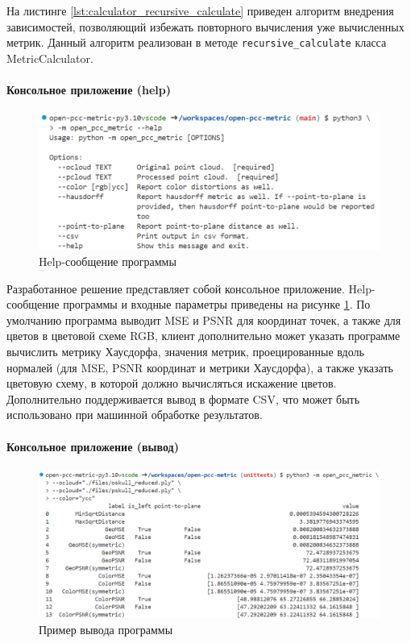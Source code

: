 \documentclass[a4paper,12pt]{extreport}
\begin{document}
На листинге \ref{lst:calculator_recursive_calculate} приведен алгоритм внедрения
зависимостей, позволяющий избежать повторного вычисления уже вычисленных метрик.
Данный алгоритм реализован в методе \texttt{recursive\_calculate} класса
MetricCalculator.

\paragraph{Консольное приложение (help)}

\begin{figure}[H]
    \centering
    \includegraphics[width=0.7\linewidth]{assets/open_pcc_metric_help.png}
    \caption{Help-сообщение программы}
    \label{img:pcc_metric_help}
\end{figure}

Разработанное решение представляет собой консольное приложение. Help-сообщение
программы и входные параметры приведены на рисунке \ref{img:pcc_metric_help}. По
умолчанию программа выводит MSE и PSNR для координат точек, а также для цветов в
цветовой схеме RGB, клиент дополнительно может указать программе вычислить
метрику Хаусдорфа, значения метрик, проецированные вдоль нормалей (для MSE, PSNR
координат и метрики Хаусдорфа), а также указать цветовую схему, в которой должно
вычисляться искажение цветов. Дополнительно поддерживается вывод в формате CSV,
что может быть использовано при машинной обработке результатов.

\paragraph{Консольное приложение (вывод)}

\begin{figure}[H]
    \centering
    \includegraphics[width=0.7\linewidth]{assets/open_pcc_metric_output.png}
    \caption{Пример вывода программы}
    \label{img:pcc_metric_output}
\end{figure}
\end{document}
